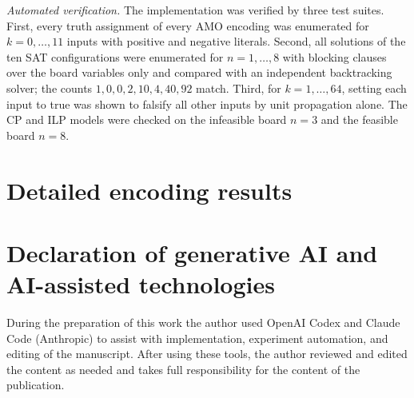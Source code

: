 \documentclass[a4paper,fleqn]{cas-sc}
\begin{document}
\textit{Automated verification.} The implementation was verified by three
test suites. First, every truth assignment of every AMO encoding was
enumerated for $k=0,\ldots,11$ inputs with positive and negative literals.
Second, all solutions of the ten SAT configurations were enumerated for
$n=1,\ldots,8$ with blocking clauses over the board variables only and
compared with an independent backtracking solver; the counts
$1,0,0,2,10,4,40,92$ match. Third, for $k=1,\ldots,64$, setting each input
to true was shown to falsify all other inputs by unit propagation alone.
The CP and ILP models were checked on the infeasible board $n=3$ and the
feasible board $n=8$.

\section{Detailed encoding results}
\label{app:sizes}
\begin{table}[pos=htbp]
\centering\small
\caption{Median process time (s) of each encoding and formulation with
CaDiCaL on each board size (Experiment~E1).}
\label{tab:enc-sizes}
\end{table}
\FloatBarrier

\section*{Declaration of generative AI and AI-assisted technologies}
During the preparation of this work the author used OpenAI Codex and
Claude Code (Anthropic) to assist with implementation, experiment
automation, and editing of the manuscript. After using these tools, the
author reviewed and edited the content as needed and takes full
responsibility for the content of the publication.



\end{document}
